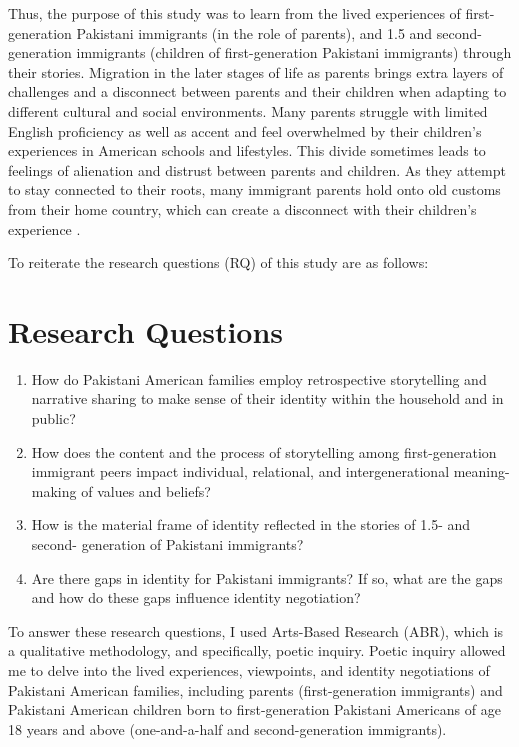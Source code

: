 Thus, the purpose of this study was to learn from the lived experiences of first-generation Pakistani immigrants (in the role of parents), and 1.5 and second-generation immigrants (children of first-generation Pakistani immigrants) through their stories. Migration in the later stages of life as parents brings extra layers of challenges and a disconnect between parents and their children when adapting to different cultural and social environments. Many parents struggle with limited English proficiency as well as accent and feel overwhelmed by their children's experiences in American schools and lifestyles. This divide sometimes leads to feelings of alienation and distrust between parents and children. As they attempt to stay connected to their roots, many immigrant parents hold onto old customs from their home country, which can create a disconnect with their children's experience \citep{aghideh2020a, khalequeDifferentialAcculturationPakistani2015}.

To reiterate the research questions (RQ) of this study are as follows:

\section{Research Questions}

\begin{enumerate}
    \item How do Pakistani American families employ retrospective storytelling and narrative sharing to make sense of their identity within the household and in public?
    \item How does the content and the process of storytelling among first-generation immigrant peers impact individual, relational, and intergenerational meaning-making of values and beliefs? 
    \item How is the material frame of identity reflected in the stories of 1.5- and second- generation of Pakistani immigrants? 
    \item Are there gaps in identity for Pakistani immigrants? If so, what are the gaps and how do these gaps influence identity negotiation?
\end{enumerate}

To answer these research questions, I used Arts-Based Research (ABR), which is a qualitative methodology, and specifically, poetic inquiry. Poetic inquiry allowed me to delve into the lived experiences, viewpoints, and identity negotiations of Pakistani American families, including parents (first-generation immigrants) and Pakistani American children born to first-generation Pakistani Americans of age 18 years and above (one-and-a-half and second-generation immigrants).

